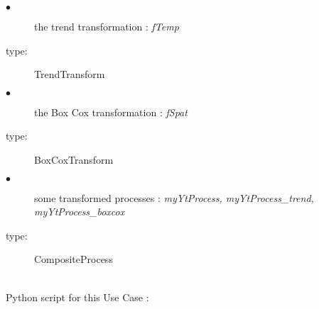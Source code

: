 {
  \begin{description}
  \item[$\bullet$] the trend transformation : {\itshape fTemp}
  \item[type:]  TrendTransform
  \end{description}

  \begin{description}
  \item[$\bullet$] the Box Cox transformation : {\itshape fSpat}
  \item[type:]  BoxCoxTransform
  \end{description}

  \begin{description}
  \item[$\bullet$] some transformed processes : {\itshape myYtProcess, myYtProcess\_trend, myYtProcess\_boxcox}
  \item[type:]  CompositeProcess
  \end{description}
}

\textspace\\
Python script for this Use Case :

